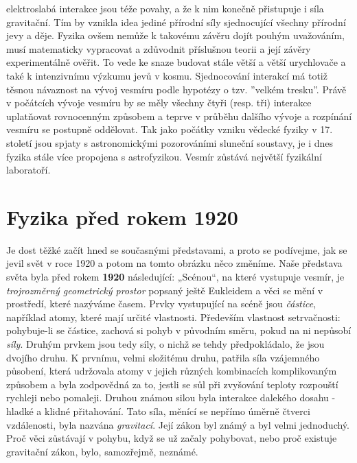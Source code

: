 {    elektroslabá interakce jsou téže povahy, a že k nim konečně přistupuje i síla gravitační. Tím 
    by vznikla idea jediné přírodní síly sjednocující všechny přírodní jevy a děje. Fyzika ovšem 
    nemůže k takovému závěru dojít pouhým uvažováním, musí matematicky vypracovat a zdůvodnit 
    příslušnou teorii a její závěry experimentálně ověřit. To vede ke snaze budovat stále větší a 
    větší urychlovače a také k intenzivnímu výzkumu jevů v kosmu. Sjednocování interakcí má totiž 
    těsnou návaznost na vývoj vesmíru podle hypotézy o tzv. ”velkém tresku”. Právě v počátcích 
    vývoje vesmíru by se měly všechny čtyři (resp. tři) interakce uplatňovat rovnocenným způsobem a 
    teprve v průběhu dalšího vývoje a rozpínání vesmíru se postupně oddělovat. Tak jako počátky 
    vzniku vědecké fyziky v 17. století jsou spjaty s astronomickými pozorováními sluneční 
    soustavy, je i dnes fyzika stále více propojena s astrofyzikou. Vesmír zůstává největší 
    fyzikální laboratoří.
  
  \section{Fyzika před rokem 1920}\label{fyz:IchapIsecIV}
    Je dost těžké začít hned se současnými představami, a proto se podívejme, jak se jevil svět v 
    roce 1920 a potom na tomto obrázku něco změníme. Naše představa světa byla před rokem 
    \textbf{1920} následující: „Scénou“, na které vystupuje vesmír, je \emph{trojrozměrný 
    geometrický prostor} popsaný ještě Eukleidem a věci se mění v prostředí, které nazýváme časem. 
    Prvky vystupující na scéně jsou \emph{částice}, například atomy, které mají určité vlastnosti. 
    Především vlastnost setrvačnosti: pohybuje-li se částice, zachová si pohyb v původním směru, 
    pokud na ni nepůsobí \emph{síly}. Druhým prvkem jsou tedy síly, o nichž se tehdy  
    předpokládalo, že jsou dvojího druhu. K prvnímu, velmi složitému druhu, patřila síla vzájemného 
    působení, která udržovala atomy v jejich různých kombinacích komplikovaným způsobem a byla 
    zodpovědná za to, jestli se sůl při zvyšování teploty rozpouští rychleji nebo pomaleji. Druhou 
    známou silou byla interakce dalekého dosahu - hladké a klidné přitahování. Tato síla, měnící se 
    nepřímo úměrně čtverci vzdálenosti, byla nazvána \emph{gravitací}. Její zákon byl známý a byl 
    velmi jednoduchý. Proč věci zůstávají v pohybu, když se už začaly pohybovat, nebo proč existuje 
    gravitační zákon, bylo, samozřejmě, neznámé.
    
}
